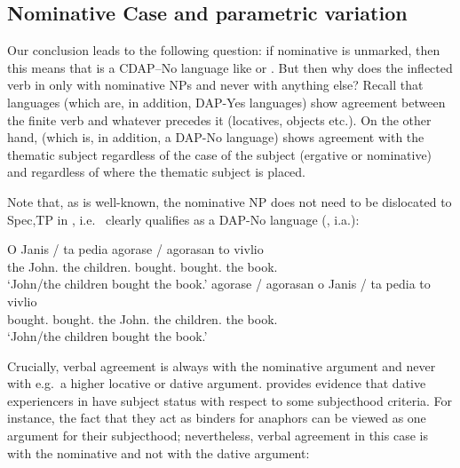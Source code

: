 \documentclass[output=paper]{langsci/langscibook}
\begin{document}
\begin{exe}
\section{Nominative Case and parametric variation}\label{sec:key:13.4}

Our conclusion leads to the following question: if nominative is unmarked, then
this means that  is a CDAP–No language like  or
. But then
why does the inflected verb in  only  with nominative NPs and never
with anything else? Recall that  languages (which are, in addition,
DAP-Yes languages) show agreement between the finite verb and whatever precedes
it (locatives, objects etc.). On the other hand,  (which is, in
addition, a DAP-No language) shows agreement with the thematic subject
regardless of the case of the subject (ergative or nominative) and regardless
of where the thematic subject is placed.

Note that, as is well-known, the nominative NP does not need to be dislocated
to Spec,TP in , i.e.\  clearly qualifies as a DAP-No language
(\citealt{AleAna1998}, i.a.):\newpage

\ea%
\label{ex:key:13.32}
	\ea
	\gll  O Janis / ta pedia agorase / agorasan to vivlio\\
    the John.\Nom{} {} the children.\Nom{} bought.\Tsg{} {} bought.\Tpl{}  the book.\Acc{}\\
	\glt     ‘John/the children bought the book.’
	\ex
	\gll  agorase / agorasan o Janis / ta pedia to vivlio\\
    bought.\Tsg{} {} bought.\Tpl{} the John.\Nom{} {} the children.\Nom{}  the book.\Acc{}\\
	\glt     ‘John/the children bought the book.’
    \z
\z

Crucially, verbal agreement is always with the nominative argument and never
with e.g.\ a higher locative or dative argument. \citet{Anagnostopoulou1999}
provides evidence that dative experiencers in  have subject status with
respect to some subjecthood criteria. For instance, the fact that they act as
binders for anaphors can be viewed as one argument for their subjecthood;
nevertheless, verbal agreement in this case is with the nominative and not with
the dative argument:


\end{exe}
\end{document}

